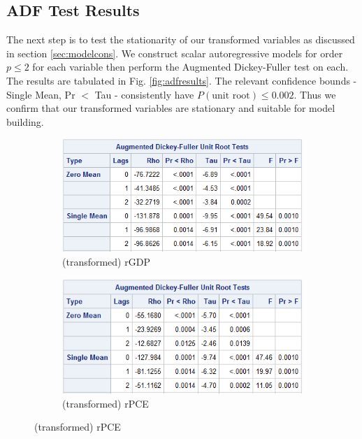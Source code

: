 \subsection{ADF Test Results}
    
    The next step is to test the stationarity of our transformed variables as 
    discussed in section \ref{sec:modelcons}. We construct scalar 
    autoregressive models for order $p \le 2$ for each variable then perform 
    the Augmented Dickey-Fuller test on each.  The results are tabulated in 
    Fig. \ref{fig:adfresults}.  The relevant confidence bounds - Single Mean, 
    Pr $<$ Tau - consistently have $P(\text{unit root}) \le 0.002$.  Thus we 
    confirm that our transformed variables are stationary and suitable for 
    model building.
    
    \begin{figure}[h]
        \begin{subfigure}{0.5\textwidth}
            \includegraphics[width=\textwidth]{../img/rgdp-fdlog-ADFtest2.png}
            \caption{(transformed) rGDP}
        \end{subfigure}
        \begin{subfigure}{0.5\textwidth}
            \includegraphics[width=\textwidth]{../img/rpce-fdlog-ADFtest2.png}
            \caption{(transformed) rPCE}

\end{subfigure}
\end{figure}
